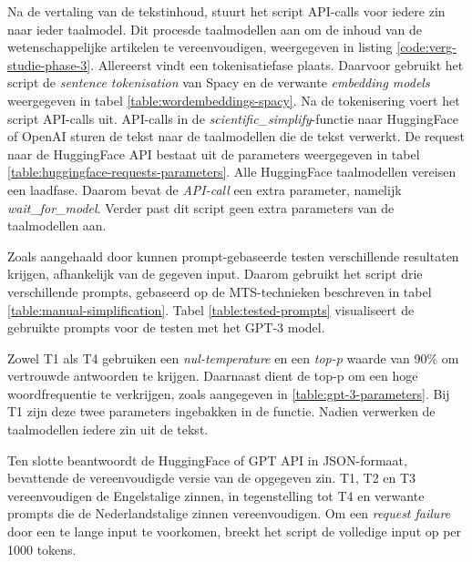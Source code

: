 Na de vertaling van de tekstinhoud, stuurt het script API-calls voor iedere zin naar ieder taalmodel. Dit procesde taalmodellen aan om de inhoud van de wetenschappelijke artikelen te vereenvoudigen, weergegeven in listing \ref{code:verg-studie-phase-3}. Allereerst vindt een tokenisatiefase plaats. Daarvoor gebruikt het script de \textit{sentence tokenisation} van Spacy en de verwante \textit{embedding models} weergegeven in tabel \ref{table:wordembeddings-spacy}. Na de tokenisering voert het script API-calls uit. API-calls in de \textit{scientific\_simplify}-functie naar HuggingFace of OpenAI sturen de tekst naar de taalmodellen die de tekst verwerkt. De request naar de HuggingFace API bestaat uit de parameters weergegeven in tabel \ref{table:huggingface-requests-parameters}. Alle HuggingFace taalmodellen vereisen een laadfase. Daarom bevat de \textit{API-call} een extra parameter, namelijk \textit{wait\_for\_model}. Verder past dit script geen extra parameters van de taalmodellen aan. 

\medspace

Zoals aangehaald door \textcite{Gooding2022} kunnen prompt-gebaseerde testen verschillende resultaten krijgen, afhankelijk van de gegeven input. Daarom gebruikt het script drie verschillende prompts, gebaseerd op de MTS-technieken beschreven in tabel \ref{table:manual-simplification}. Tabel \ref{table:tested-prompts} visualiseert de gebruikte prompts voor de testen met het GPT-3 model. 

\medspace

Zowel T1 als T4 gebruiken een \textit{nul-temperature} en een \textit{top-p} waarde van 90\% om vertrouwde antwoorden te krijgen. Daarnaast dient de top-p om een hoge woordfrequentie te verkrijgen, zoals aangegeven in \ref{table:gpt-3-parameters}. Bij T1 zijn deze twee parameters ingebakken in de functie. Nadien verwerken de taalmodellen iedere zin uit de tekst. 

\medspace

Ten slotte beantwoordt de HuggingFace of GPT API in JSON-formaat, bevattende de vereenvoudigde versie van de opgegeven zin. T1, T2 en T3 vereenvoudigen de Engelstalige zinnen, in tegenstelling tot T4 en verwante prompts die de Nederlandstalige zinnen vereenvoudigen. Om een \textit{request failure} door een te lange input te voorkomen, breekt het script de volledige input op per 1000 tokens.


